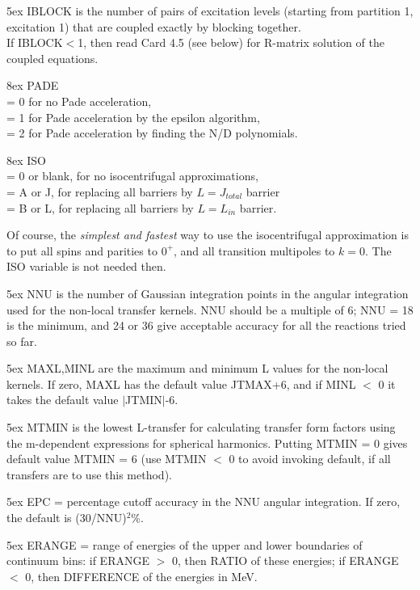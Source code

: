 \documentclass[11pt]{article}
\begin{document}
\hangindent 5ex
IBLOCK is the number of pairs of excitation levels
(starting from partition 1, excitation 1) that are coupled exactly by
blocking together.\\
If IBLOCK$<$1, then read Card 4.5 (see below) for R-matrix solution of the
coupled equations.

\hangindent 8ex
PADE
\\ = 0 for no Pade acceleration,
\\ = 1 for Pade acceleration by the epsilon algorithm,
\\ = 2 for Pade acceleration by finding the N/D polynomials.



\hangindent 8ex
ISO
\\ = 0 or blank, for no isocentrifugal approximations,
\\ = A or J, for replacing all barriers by $L = J_{total}$ barrier
\\ = B or L, for replacing all barriers by $L = L_{in}$ barrier.


Of course, the {\em simplest and fastest} way to use the isocentrifugal
approximation is to put all spins and parities to $0^+$, and all
transition multipoles to $k=0$. The ISO variable is not needed then.

\hangindent 5ex
NNU is the number of Gaussian integration points
in the angular
integration used for the non-local transfer kernels. NNU should
be a multiple of 6; NNU = 18 is the minimum, and 24 or 36 give
acceptable accuracy for all the reactions tried so far.


\hangindent 5ex
MAXL,MINL are the maximum and minimum L values
for the non-local
kernels. If zero, MAXL has the default value JTMAX+6, and
if MINL $<$ 0 it takes the default value $|$JTMIN$|$-6.


\hangindent 5ex
MTMIN is the lowest L-transfer for calculating transfer form factors
using the m-dependent expressions for spherical harmonics.
Putting MTMIN = 0 gives default value MTMIN = 6 (use MTMIN $<$ 0 to avoid
invoking default, if all transfers are to use this method).


\hangindent 5ex
EPC = percentage cutoff accuracy in the
NNU angular integration.
If zero, the default is (30/NNU)$^2$\%.

\hangindent 5ex
ERANGE = range of energies of the upper and lower boundaries
of continuum bins: if ERANGE $>$ 0, then RATIO of these energies;
if ERANGE $<$ 0, then DIFFERENCE of the energies in MeV.
\end{document}
